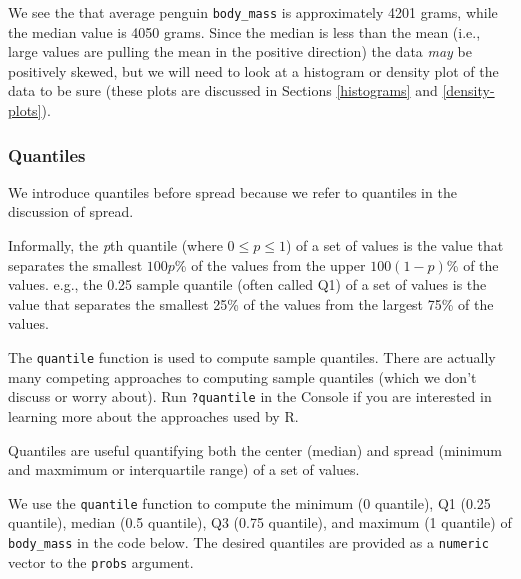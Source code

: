 \documentclass[
]{book}
\newenvironment{Shaded}{\begin{snugshade}}{\end{snugshade}}
\newcommand{\AttributeTok}[1]{\textcolor[rgb]{0.77,0.63,0.00}{#1}}
\newcommand{\CommentTok}[1]{\textcolor[rgb]{0.56,0.35,0.01}{\textit{#1}}}
\newcommand{\ConstantTok}[1]{\textcolor[rgb]{0.00,0.00,0.00}{#1}}
\newcommand{\DocumentationTok}[1]{\textcolor[rgb]{0.56,0.35,0.01}{\textbf{\textit{#1}}}}
\newcommand{\FunctionTok}[1]{\textcolor[rgb]{0.00,0.00,0.00}{#1}}
\newcommand{\NormalTok}[1]{#1}
\newcommand{\SpecialCharTok}[1]{\textcolor[rgb]{0.00,0.00,0.00}{#1}}
\theoremstyle{definition}
\theoremstyle{definition}
\theoremstyle{definition}
\theoremstyle{definition}
\theoremstyle{remark}
\begin{document}
\begin{Shaded}
\end{Shaded}

We see the that average penguin \texttt{body\_mass} is approximately 4201 grams, while the median value is 4050 grams. Since the median is less than the mean (i.e., large values are pulling the mean in the positive direction) the data \emph{may} be positively skewed, but we will need to look at a histogram or density plot of the data to be sure (these plots are discussed in Sections \ref{histograms} and \ref{density-plots}).

\hypertarget{quantiles}{%
\subsubsection{Quantiles}\label{quantiles}}

We introduce quantiles before spread because we refer to quantiles in the discussion of spread.

Informally, the \emph{p}th quantile (where \(0\leq p \leq 1\)) of a set of values is the value that separates the smallest \(100 p\)\% of the values from the upper \(100(1-p)\)\% of the values. e.g., the 0.25 sample quantile (often called Q1) of a set of values is the value that separates the smallest 25\% of the values from the largest 75\% of the values.

The \texttt{quantile} function is used to compute sample quantiles. There are actually many competing approaches to computing sample quantiles (which we don't discuss or worry about). Run \texttt{?quantile} in the Console if you are interested in learning more about the approaches used by R.

Quantiles are useful quantifying both the center (median) and spread (minimum and maxmimum or interquartile range) of a set of values.

We use the \texttt{quantile} function to compute the minimum (0 quantile), Q1 (0.25 quantile), median (0.5 quantile), Q3 (0.75 quantile), and maximum (1 quantile) of \texttt{body\_mass} in the code below. The desired quantiles are provided as a \texttt{numeric} vector to the \texttt{probs} argument.
\end{document}
